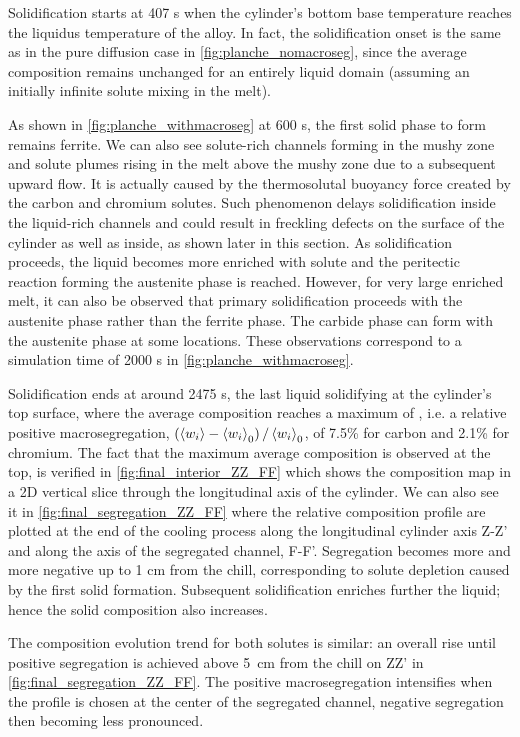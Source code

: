 Solidification starts at 407 s when the cylinder’s bottom base temperature 
reaches the liquidus temperature of the alloy. 
In fact, the solidification onset is the same as in the pure diffusion case in \cref{fig:planche_nomacroseg}, 
since the average composition remains unchanged for an entirely liquid domain (assuming an initially infinite 
solute mixing in the melt). 

As shown in \cref{fig:planche_withmacroseg} at 600 s, the first solid phase to form 
remains ferrite. We can also see solute-rich channels forming in the mushy zone and solute 
plumes rising in the melt above the mushy zone due to a subsequent upward flow. It is actually 
caused by the thermosolutal buoyancy force created by the carbon and chromium solutes. Such 
phenomenon delays solidification inside the liquid-rich channels and could result in freckling 
defects \citep{felicelli_simulation_1991} on the surface of the cylinder as well as inside, as shown later in this section. 
As solidification proceeds, the liquid becomes more enriched with solute and the peritectic 
reaction forming the austenite phase is reached. However, for very large enriched melt, it can 
also be observed that primary solidification proceeds with the austenite phase rather than the 
ferrite phase. The carbide phase can form with the austenite phase at some locations. These 
observations correspond to a simulation time of \num{2000} s in \cref{fig:planche_withmacroseg}. 

Solidification ends at around \num{2475} s, the last liquid solidifying at the cylinder’s top surface, where the average composition 
reaches a maximum of , i.e. a relative positive macrosegregation, 
$\left( \left \langle w_i \right \rangle-\left \langle w_i \right \rangle_0 \right)/\left \langle w_i \right \rangle_0$, of 7.5\% for carbon and 2.1\% for chromium. The fact that the maximum average 
composition is observed at the top, is verified in \cref{fig:final_interior_ZZ_FF} which shows the composition map in a 2D 
vertical slice through the longitudinal axis of the cylinder. We can also see it in \cref{fig:final_segregation_ZZ_FF} where the 
relative composition profile are plotted at the end of the cooling process along the longitudinal cylinder 
axis Z-Z’ and along the axis of the segregated channel, F-F’. 
Segregation becomes more and more negative up to 1 cm from the chill, corresponding 
to solute depletion caused by the first solid formation. Subsequent solidification enriches further the 
liquid; hence the solid composition also increases. 

The composition evolution trend for both solutes is similar: 
an overall rise until positive segregation is achieved above \SI{5}{\centi\metre} from the 
chill on ZZ' in \cref{fig:final_segregation_ZZ_FF}. 
The positive macrosegregation intensifies when the profile is chosen at the center of 
the segregated channel, negative segregation then becoming less pronounced.


